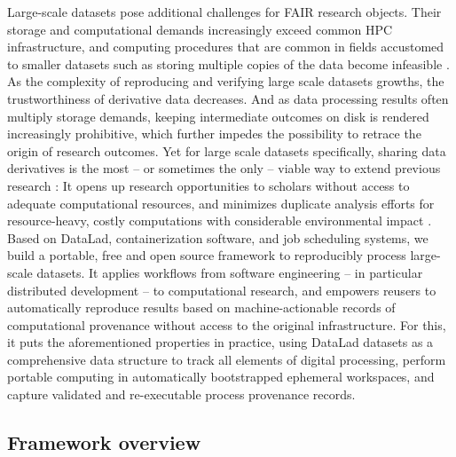 Large-scale datasets pose additional challenges for \gls{FAIR} research objects.
Their storage and computational demands increasingly exceed common \gls{HPC} infrastructure, and computing procedures that are common in fields accustomed to smaller datasets such as storing multiple copies of the data become infeasible \citep{horien2021hitchhiker}.
As the complexity of reproducing and verifying large scale datasets growths, the trustworthiness of derivative data decreases.
And as data processing results often multiply storage demands, keeping intermediate outcomes on disk is rendered increasingly prohibitive, which further impedes the possibility to retrace the origin of research outcomes.
Yet for large scale datasets specifically, sharing data derivatives is the most -- or sometimes the only -- viable way to extend previous research \citep{craddock2013neuro}:
It opens up research opportunities to scholars without access to adequate computational resources, and minimizes duplicate analysis efforts for resource-heavy, costly computations with considerable environmental impact \citep{portegies2020ecological}.\\
Based on DataLad, containerization software, and job scheduling systems, we build a portable, free and open source framework to reproducibly process large-scale datasets.
It applies workflows from software engineering -- in particular distributed development -- to computational research, and empowers reusers to automatically reproduce results based on machine-actionable records of computational provenance without access to the original infrastructure.
For this, it puts the aforementioned properties in practice, using DataLad datasets as a comprehensive data structure to track all elements of digital processing, perform portable computing in automatically bootstrapped ephemeral workspaces, and capture validated and re-executable process provenance records.

\subsection{Framework overview}


